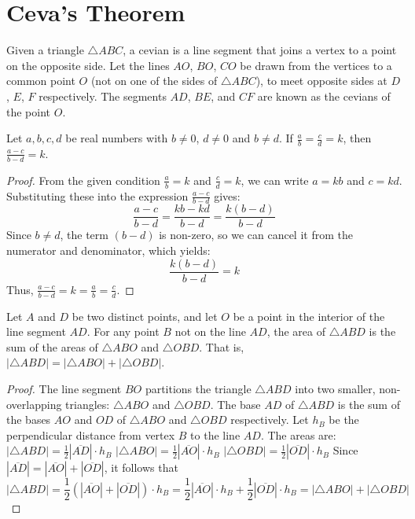 \chapter{Ceva's Theorem}

\begin{definition}[Cevian]
    \label{def:Cevian}
    Given a triangle $\triangle ABC$, a cevian is a line segment that joins a vertex to a point on the opposite side. Let the lines $AO$, $BO$, $CO$ be drawn from the vertices to a common point $O$ (not on one of the sides of $\triangle ABC$), to meet opposite sides at $D$, $E$, $F$ respectively. The segments $AD$, $BE$, and $CF$ are known as the cevians of the point $O$.
\end{definition}

\begin{lemma}
    \label{lem:Property_of_Proportions}
    Let $a, b, c, d$ be real numbers with $b \neq 0$, $d \neq 0$ and $b \neq d$. If $\frac{a}{b} = \frac{c}{d} = k$, then $\frac{a-c}{b-d} = k$.
\end{lemma}

\begin{proof}
    From the given condition $\frac{a}{b} = k$ and $\frac{c}{d} = k$, we can write $a = kb$ and $c = kd$.
    Substituting these into the expression $\frac{a-c}{b-d}$ gives:
    \[ \frac{a-c}{b-d} = \frac{kb - kd}{b-d} = \frac{k(b-d)}{b-d} \]
    Since $b \neq d$, the term $(b-d)$ is non-zero, so we can cancel it from the numerator and denominator, which yields:
    \[ \frac{k(b-d)}{b-d} = k \]
    Thus, $\frac{a-c}{b-d} = k = \frac{a}{b} = \frac{c}{d}$.
\end{proof}

\begin{lemma}
    \label{lem:Area_Addition_Postulate}
    Let $A$ and $D$ be two distinct points, and let $O$ be a point in the interior of the line segment $AD$. For any point $B$ not on the line $AD$, the area of $\triangle ABD$ is the sum of the areas of $\triangle ABO$ and $\triangle OBD$. That is, $|\triangle ABD| = |\triangle ABO| + |\triangle OBD|$.
\end{lemma}

\begin{proof}
    The line segment $BO$ partitions the triangle $\triangle ABD$ into two smaller, non-overlapping triangles: $\triangle ABO$ and $\triangle OBD$. The base $AD$ of $\triangle ABD$ is the sum of the bases $AO$ and $OD$ of $\triangle ABO$ and $\triangle OBD$ respectively. Let $h_B$ be the perpendicular distance from vertex $B$ to the line $AD$. The areas are:
    $|\triangle ABD| = \frac{1}{2} |\overline{AD}| \cdot h_B$
    $|\triangle ABO| = \frac{1}{2} |\overline{AO}| \cdot h_B$
    $|\triangle OBD| = \frac{1}{2} |\overline{OD}| \cdot h_B$
    Since $|\overline{AD}| = |\overline{AO}| + |\overline{OD}|$, it follows that
    \[ |\triangle ABD| = \frac{1}{2} (|\overline{AO}| + |\overline{OD}|) \cdot h_B = \frac{1}{2} |\overline{AO}| \cdot h_B + \frac{1}{2} |\overline{OD}| \cdot h_B = |\triangle ABO| + |\triangle OBD| \]
\end{proof}

